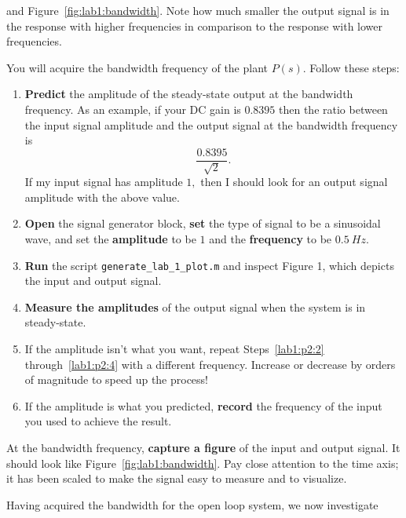and Figure~\ref{fig:lab1:bandwidth}. Note how much smaller the output signal
is in the response with higher frequencies in comparison to the response
with lower frequencies.
%
\begin{procedure}[label={proc:lab1:p2}]
  You will acquire the bandwidth frequency of the plant \(P(s)\).
  Follow these steps:
  \begin{enumerate}[label=(\arabic*)]
    \item{
      \textbf{Predict} the amplitude of the steady-state output at the
      bandwidth frequency. As an example, if your DC gain is \(0.8395\) then
      the ratio between the input signal amplitude and the output signal
      at the bandwidth frequency is
      \[
        \frac{0.8395}{\sqrt{2}}.
      \]
      If my input signal has amplitude \(1,\) then I should look for
      an output signal amplitude with the above value.
    }
    \item{
      \label{lab1:p2:2}
      \textbf{Open} the signal generator block, \textbf{set} the type of signal
      to be a sinusoidal wave, and set the
      \textbf{amplitude} to be \(1\) and
      the \textbf{frequency} to be \(\SI{0.5}{Hz}.\)
    }
    \item{
      \textbf{Run} the script \texttt{generate\_lab\_1\_plot.m} and inspect
      Figure 1, which depicts the input and output signal.
    }
    \item{
      \label{lab1:p2:4}
      \textbf{Measure the amplitudes} of the output signal
      when the system is in steady-state.
    }
    \item{
      If the amplitude isn't what you want, repeat Steps~\ref{lab1:p2:2} through~\ref{lab1:p2:4} with a different frequency. Increase or decrease
      by orders of magnitude to speed up the process!
    }
    \item{
      If the amplitude is what you predicted, \textbf{record} the frequency
      of the input you used to achieve the result.
    }
  \end{enumerate}
\end{procedure}
%
\begin{deliverable}[label={lab1:d2}]
  At the bandwidth frequency,
  \textbf{capture a figure} of the input and output signal. It should look
  like Figure~\ref{fig:lab1:bandwidth}. Pay close attention to the time
  axis; it has been scaled to make the signal easy to measure and to visualize.
\end{deliverable}
%
Having acquired the bandwidth for the open loop system, we now investigate
